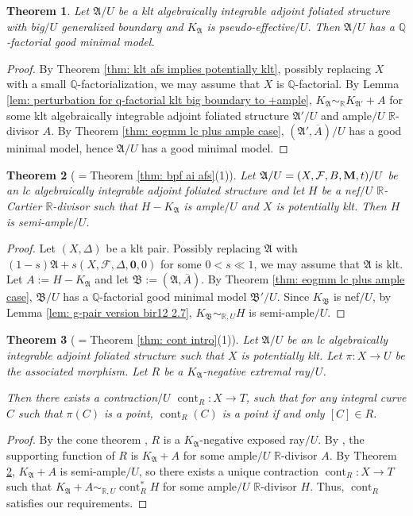 \documentclass[12pt]{amsart}
\numberwithin{equation}{section}
\newcommand{\Mm}{{\bf{M}}}
\newcommand{\Rr}{\mathbb{R}}
\newcommand{\cont}{\operatorname{cont}}
\newcommand{\Aa}{{\mathfrak{A}}}
\newcommand{\Bb}{{\mathfrak{B}}}
\newcommand{\Ff}{\mathcal{F}}
\newtheorem{thm}{Theorem}[section]
\theoremstyle{definition}
\theoremstyle{definition}
\theoremstyle{definition}
\begin{document}
 \begin{thm}\label{thm: eogmm boundary big case}
    Let $\Aa/U$ be a klt algebraically integrable adjoint foliated structure with big$/U$ generalized boundary and $K_{\Aa}$ is pseudo-effective$/U$. Then $\Aa/U$ has a $\mathbb Q$-factorial good minimal model.
\end{thm}
\begin{proof}
By Theorem \ref{thm: klt afs implies potentially klt}, possibly replacing $X$ with a small $\mathbb Q$-factorialization, we may assume that $X$ is $\mathbb Q$-factorial. By Lemma \ref{lem: perturbation for q-factorial klt big boundary to +ample}, $K_{\Aa}\sim_{\mathbb R}K_{\Aa'}+A$ for some klt algebraically integrable adjoint foliated structure $\Aa'/U$ and ample$/U$ $\Rr$-divisor $A$. By Theorem \ref{thm: eogmm lc plus ample case}, $(\Aa',\overline{A})/U$ has a good minimal model, hence $\Aa/U$ has a good minimal model.
\end{proof}

 \begin{thm}[{$=$Theorem \ref{thm: bpf ai afs}(1)}]\label{thm: semi-ampleness theorem}
    Let $\Aa/U=(X,\Ff,B,\Mm,t)/U$ be an lc algebraically integrable adjoint foliated structure and let $H$ be a nef$/U$ $\Rr$-Cartier $\Rr$-divisor such that $H-K_{\Aa}$ is ample$/U$ and $X$ is potentially klt. Then $H$ is semi-ample$/U$.
\end{thm}
\begin{proof}
Let $(X,\Delta)$ be a klt pair. Possibly replacing $\Aa$ with $(1-s)\Aa+s(X,\Ff,\Delta,\bm{0},0)$ for some $0<s\ll 1$, we may assume that $\Aa$ is klt. Let $A:=H-K_{\Aa}$ and let $\Bb:=(\Aa,\overline{A})$. By Theorem \ref{thm: eogmm lc plus ample case}, $\Bb/U$ has a $\mathbb Q$-factorial good minimal model $\Bb'/U$. Since $K_{\Bb}$ is nef$/U$, by Lemma \ref{lem: g-pair version bir12 2.7}, $K_{\Bb}\sim_{\mathbb R,U}H$ is  semi-ample$/U$.
\end{proof}

\begin{thm}[{$=$Theorem \ref{thm: cont intro}(1)}]\label{thm: contraciton theorem potentially klt}
     Let $\Aa/U$ be an lc algebraically integrable adjoint foliated structure such that $X$ is potentially klt. Let $\pi: X\rightarrow U$ be the associated morphism. Let $R$ be a $K_{\Aa}$-negative extremal ray$/U$. 
     
     Then there exists a
contraction$/U$ $\cont_R: X\rightarrow T$, such that for any integral curve $C$ such that $\pi(C)$ is a point, $\cont_R(C)$ is a point if and only $[C]\in R$.
\end{thm}
\begin{proof}
By the cone theorem \cite[Theorem 1.2]{CHLMSSX24}, $R$ is a $K_{\Aa}$-negative exposed ray$/U$. By \cite[Lemma 8.4.1]{CHLX23}, the supporting function of $R$ is $K_{\Aa}+A$ for some ample$/U$ $\Rr$-divisor $A$. By Theorem \ref{thm: semi-ampleness theorem}, $K_{\Aa}+A$ is semi-ample$/U$, so there exists a unique contraction $\cont_R: X\rightarrow T$ such that $K_{\Aa}+A\sim_{\mathbb R,U}\cont_R^*H$ for some ample$/U$ $\Rr$-divisor $H$. Thus, $\cont_R$ satisfies our requirements.
\end{proof}
\end{document}

